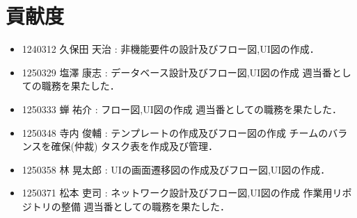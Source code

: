 \documentclass[a4paper, titlepage]{jsarticle}
\begin{document}
\section{貢献度}
\begin{itemize}
  \item 1240312 久保田 天治 : 非機能要件の設計及びフロー図,UI図の作成．
  \item 1250329 塩澤 康志 : データベース設計及びフロー図,UI図の作成 週当番としての職務を果たした．
  \item 1250333 蝉 祐介 : フロー図,UI図の作成 週当番としての職務を果たした．
  \item 1250348 寺内 俊輔 : テンプレートの作成及びフロー図の作成 チームのバランスを確保(仲裁) タスク表を作成及び管理．
  \item 1250358 林 晃太郎 : UIの画面遷移図の作成及びフロー図,UI図の作成．
  \item 1250371 松本 吏司 : ネットワーク設計及びフロー図,UI図の作成 作業用リポジトリの整備 週当番としての職務を果たした．
\end{itemize}
\end{document}
